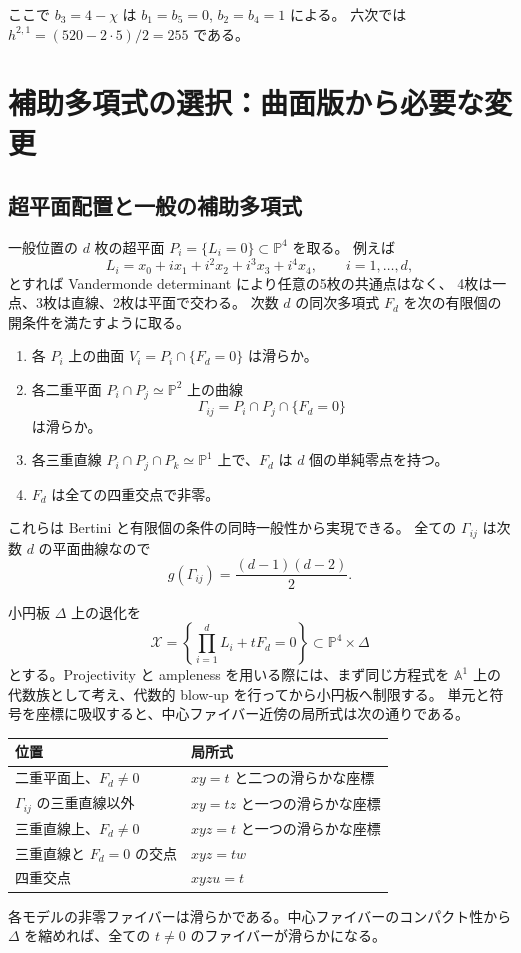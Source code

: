 \documentclass[11pt,a4paper]{article}
\theoremstyle{definition}
\newcommand{\PP}{\mathbb P}
\newcommand{\cX}{\mathcal X}
\begin{document}

ここで $b_3=4-\chi$ は $b_1=b_5=0$, $b_2=b_4=1$ による。
六次では $h^{2,1}=(520-2\cdot5)/2=255$ である。

\section{補助多項式の選択：曲面版から必要な変更}\label{sec:pencil}

\subsection{超平面配置と一般の補助多項式}

一般位置の $d$ 枚の超平面 $P_i=\{L_i=0\}\subset\PP^4$ を取る。
例えば
\[
L_i=x_0+i x_1+i^2x_2+i^3x_3+i^4x_4,\qquad i=1,\ldots,d,
\]
とすれば Vandermonde determinant により任意の5枚の共通点はなく、
4枚は一点、3枚は直線、2枚は平面で交わる。
次数 $d$ の同次多項式 $F_d$ を次の有限個の開条件を満たすように取る。
\begin{enumerate}
\item 各 $P_i$ 上の曲面 $V_i=P_i\cap\{F_d=0\}$ は滑らか。
\item 各二重平面 $P_i\cap P_j\simeq\PP^2$ 上の曲線
\[
\Gamma_{ij}=P_i\cap P_j\cap\{F_d=0\}
\]
は滑らか。
\item 各三重直線 $P_i\cap P_j\cap P_k\simeq\PP^1$ 上で、$F_d$ は $d$ 個の単純零点を持つ。
\item $F_d$ は全ての四重交点で非零。
\end{enumerate}
これらは Bertini と有限個の条件の同時一般性から実現できる。
全ての $\Gamma_{ij}$ は次数 $d$ の平面曲線なので
\begin{equation}\label{eq:genus}
g(\Gamma_{ij})=\frac{(d-1)(d-2)}2.
\end{equation}

小円板 $\Delta$ 上の退化を
\begin{equation}\label{eq:family}
\cX=\left\{\prod_{i=1}^dL_i+tF_d=0\right\}
\subset\PP^4\times\Delta
\end{equation}
とする。Projectivity と ampleness を用いる際には、まず同じ方程式を
$\mathbb A^1$ 上の代数族として考え、代数的 blow-up を行ってから小円板へ制限する。
単元と符号を座標に吸収すると、中心ファイバー近傍の局所式は次の通りである。
\begin{center}
\begin{tabularx}{\linewidth}{@{}lX@{}}
\toprule
位置 & 局所式\\
\midrule
二重平面上、$F_d\ne0$ & $xy=t$ と二つの滑らかな座標\\
$\Gamma_{ij}$ の三重直線以外 & $xy=tz$ と一つの滑らかな座標\\
三重直線上、$F_d\ne0$ & $xyz=t$ と一つの滑らかな座標\\
三重直線と $F_d=0$ の交点 & $xyz=tw$\\
四重交点 & $xyzu=t$\\
\bottomrule
\end{tabularx}
\end{center}
各モデルの非零ファイバーは滑らかである。中心ファイバーのコンパクト性から
$\Delta$ を縮めれば、全ての $t\ne0$ のファイバーが滑らかになる。
\end{document}
